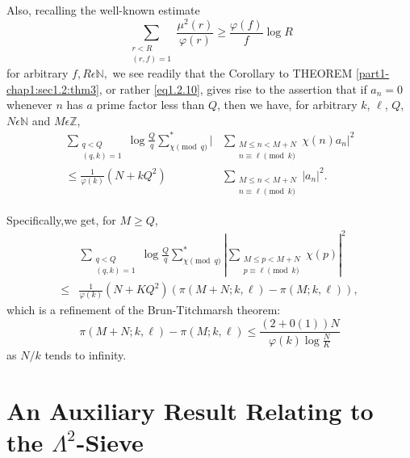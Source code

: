 Also, recalling the well-known estimate
\begin{equation*}
\sum_{\substack{r<R\\ (r,f)=1}}\frac{\mu^2(r)}{\varphi(r)}\geq
\frac{\varphi(f)}{f} \log R \tag{1.2.12} \label{eq1.2.12}
\end{equation*}
for arbitrary $f,R \epsilon  \mathbb{N},$ we see readily that the
Corollary to THEOREM \ref{part1-chap1:sec1.2:thm3}, or rather
\eqref{eq1.2.10}, gives rise to the 
assertion that if $a_n=0$ whenever $n $ has $a$ prime factor less than
$Q$, then we have, for arbitrary $k$, $\ell$, $Q$, $N \epsilon  \mathbb{N}$
and $M \epsilon  \mathbb{Z}$, 
\begin{equation*}
  \begin{aligned}
    \sum_{\substack{q<Q\\ (q,k)=1}} \log \frac{Q}{q}\sum^*_{\chi \pmod{q}}
    |&\sum_{\substack{M\leq n<M+N\\ n\equiv \ell \pmod{k}}} \chi (n)a_n|^2 \\
    \leq \frac{1}{\varphi(k)}(N+kQ^2)&\sum_{\substack{M\leq n<M+N\\ n\equiv
        \ell \pmod{k}}}|a_n|^2.
  \end{aligned}
  \tag{1.2.13} \label{eq1.2.13}
\end{equation*}

Specifically,\pageoriginale we get, for $M\geq Q$,
\begin{equation*}
  \begin{aligned}
    &\sum_{\substack{q<Q\\(q,k)=1}}\log \frac{Q}{q} \sum^*_{\chi
      \pmod{q}}|\sum_{\substack{M\leq p<M+N\\ p\equiv \ell \pmod{k}}}\chi
    (p)|^2\\   
    \leq &\frac{1}{\varphi(k)}(N+KQ^2)(\pi (M+N; k,\ell)-\pi (M;k,\ell)),
  \end{aligned}
  \tag{1.2.14} \label{eq1.2.14}
\end{equation*}
which is a refinement of the Brun-Titchmarsh theorem:
\begin{equation*}
  \pi (M+N;k,\ell)-\pi (M;k,\ell)\leq \frac{(2+0(1))N}{\varphi(k)\log
  \frac{N}{K}} \tag{1.2.15} \label{eq1.2.15}
\end{equation*}
as $N/k$ tends to infinity.

\section{An Auxiliary Result Relating to the
  $\Lambda^2$-Sieve}\label{part1-chap1:sec1.3}%

